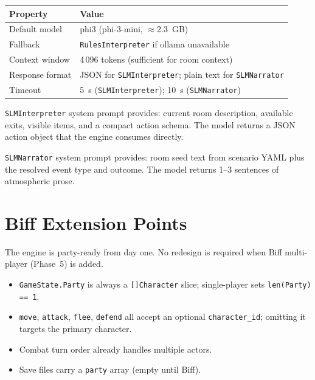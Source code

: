 \documentclass[a4paper,10pt]{article}
\newcommand{\tool}[1]{\texttt{#1}}
\newcommand{\field}[1]{\texttt{#1}}
\begin{document}
\begin{center}
\begin{tabular}{ll}
\toprule
\textbf{Property} & \textbf{Value} \\
\midrule
Default model    & phi3 (phi-3-mini, $\approx$2.3~GB) \\
Fallback         & \texttt{RulesInterpreter} if ollama unavailable \\
Context window   & 4\,096 tokens (sufficient for room context) \\
Response format  & JSON for \texttt{SLMInterpreter}; plain text for \texttt{SLMNarrator} \\
Timeout          & 5~s (\texttt{SLMInterpreter}); 10~s (\texttt{SLMNarrator}) \\
\bottomrule
\end{tabular}
\end{center}

\texttt{SLMInterpreter} system prompt provides: current room
description, available exits, visible items, and a compact action
schema.  The model returns a JSON action object that the engine
consumes directly.

\texttt{SLMNarrator} system prompt provides: room seed text from
scenario YAML plus the resolved event type and outcome.  The model
returns 1--3 sentences of atmospheric prose.

\section{Biff Extension Points}

The engine is party-ready from day one.  No redesign is required
when Biff multi-player (Phase~5) is added.

\begin{itemize}
  \item \texttt{GameState.Party} is always a \texttt{[]Character}
    slice; single-player sets \texttt{len(Party) == 1}.
  \item \tool{move}, \tool{attack}, \tool{flee}, \tool{defend} all
    accept an optional \field{character\_id}; omitting it targets
    the primary character.
  \item Combat turn order already handles multiple actors.
  \item Save files carry a \field{party} array (empty until Biff).
\end{itemize}
\end{document}
